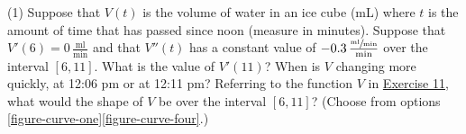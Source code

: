 \documentclass[12pt,]{book}
\theoremstyle{plain}
\theoremstyle{definition}
\numberwithin{equation}{section}
\newcounter{figstack}
\newlength\fight
\newcommand\pushValignCaptionBottom[5][b]{%
\stepcounter{figstack}%
\expandafter\def\csname %
figalign\romannumeral\value{figstack}\endcsname{#1}%
\expandafter\def\csname %
figtype\romannumeral\value{figstack}\endcsname{#2}%
\expandafter\def\csname %
figwd\romannumeral\value{figstack}\endcsname{#3}%
\expandafter\def\csname %
figcontent\romannumeral\value{figstack}\endcsname{#4}%
\expandafter\def\csname %
figcap\romannumeral\value{figstack}\endcsname{#5}%
\setbox0=\hbox{%
\begin{#2}{#3}#4\end{#2}}%
\ifdim\dimexpr\ht0+\dp0\relax>\fight\global\setlength{\fight}{%
\dimexpr\ht0+\dp0\relax}\fi%
}
\newcommand{\fe}[2]{#1\mathopen{}\left(#2\right)\mathclose{}}
\newcommand{\cinterval}[2]{\left[#1,#2\right]}
\newcommand{\fd}[1]{#1'}
\newcommand{\sd}[1]{#1''}
\begin{document}
\par
\begin{exercisegroup}(1)
\exercise[11.]\hypertarget{exercise-ice-cube}{\null}Suppose that \(\fe{V}{t}\) is the volume of water in an ice cube (\si{\milli\liter}) where \(t\) is the amount of time that has passed since noon (measure in minutes).  Suppose that \(\fe{\fd{V}}{6}=0\,\frac{\text{ml}}{\text{min}}\) and that \(\fe{\sd{V}}{t}\) has a constant value of \(-0.3\,\frac{\sfrac{\text{ml}}{\text{min}}}{\text{min}}\) over the interval \(\cinterval{6}{11}\).  What is the value of \(\fe{\fd{V}}{11}\)?  When is \(V\) changing more quickly, at 12:06 pm or at 12:11 pm?%
\exercise[12.]\hypertarget{exercise-289}{\null}Referring to the function \(V\) in \hyperlink{exercise-ice-cube}{Exercise 11}, what would the shape of \(V\) be over the interval \(\cinterval{6}{11}\)?  (Choose from options \hyperref[figure-curve-one]{\ref{figure-curve-one}}\textendash{}\hyperref[figure-curve-four]{\ref{figure-curve-four}}.)%
\end{exercisegroup}
\end{document}
